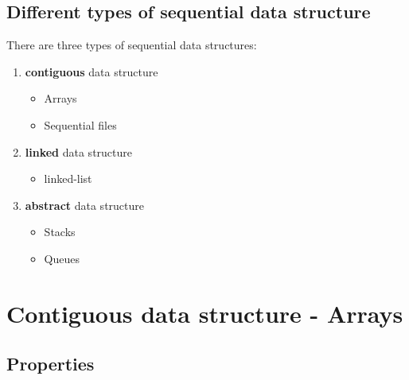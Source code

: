 \documentclass{beamer}[10pt, usepdftitle=false, handout]
\begin{document}
	\subsection{Different types of sequential data structure}			
	
	\begin{frame}	
	
	There are three types of sequential data structures:
	
	\begin{enumerate}
	\item {\textbf{contiguous} data structure
		\begin{itemize}
			\item {Arrays}
			\item {Sequential files}
		\end{itemize} }	
	\item {\textbf{linked} data structure
		\begin{itemize}
			\item {linked-list}
		\end{itemize} }
	\item {\textbf{abstract} data structure 
		\begin{itemize}
			\item {Stacks}
			\item {Queues} 
		\end{itemize}	
	}		
	\end{enumerate}
	
	
	\end{frame}
	
	\section{Contiguous data structure - Arrays}
	\subsection{Properties}	
	
\end{document}
